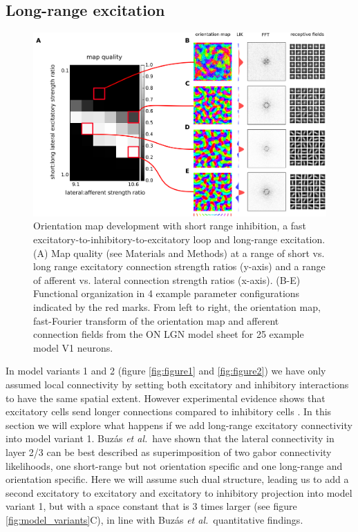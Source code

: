 \documentclass[utf8]{frontiersSCNS}
\newcommand{\etal}{\textit{et al.}}
\begin{document}
\subsection{Long-range excitation} \label{sec:SM3}

\begin{figure}[htpb!] 
\centering
\includegraphics[width=16cm]{./SVG/Figure3/figure3.png}
\caption{Orientation map development with short range inhibition, a fast excitatory-to-inhibitory-to-excitatory loop and long-range excitation. (A) Map quality (see Materials and Methods) at a range of 
short vs. long range excitatory connection strength ratios (y-axis) and a range of afferent vs. lateral connection strength ratios (x-axis). (B-E) Functional organization in 4 example parameter configurations 
indicated by the red marks. From left to right, the orientation map, fast-Fourier transform of the orientation map and afferent connection fields from the ON LGN model sheet for 25 example model V1 neurons.}
\label{fig:figure3}
\end{figure} 

In model variants 1 and 2 (figure \ref{fig:figure1} and \ref{fig:figure2}) we have only assumed local connectivity by setting both excitatory and inhibitory interactions to have the same spatial extent. 
However experimental evidence shows that excitatory cells send longer connections compared to inhibitory cells \citep{Buzas2006,Budd2001}. In this section we will explore what happens if we add long-range excitatory connectivity into model variant 1. Buz\'as \etal\,\citep{Buzas2006} have
shown that the lateral connectivity in layer 2/3 can be best described as superimposition of two gabor connectivity likelihoods, one short-range but not orientation 
specific and one long-range and orientation specific. Here we will assume such dual structure, leading us to add a second excitatory to excitatory and excitatory to 
inhibitory projection into model variant 1, but with a space constant that is 3 times larger (see figure \ref{fig:model_variants}C), in line with Buz\'as \etal \, \citep{Buzas2006} quantitative findings. 
\end{document}
